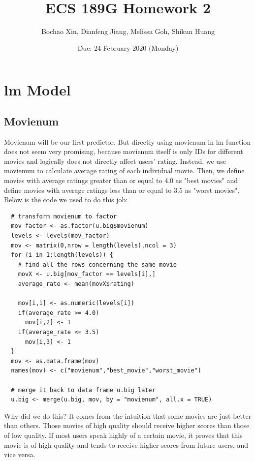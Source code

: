 \documentclass[11pt]{article}
\title{ECS 189G Homework 2}
\author{Bochao Xin, Dianfeng Jiang, Melissa Goh, Shikun Huang}
\date{Due: 24 February 2020 (Monday)}
\begin{document}
\maketitle
\newpage
\tableofcontents
\newpage

\section{lm Model}
\subsection{Movienum}
Movienum will be our first predictor. But directly using movienum 
in lm function does not seem very promising, because movienum 
itself is only IDs for different movies and logically does not 
directly affect users' rating. Instead, we use movienum to 
calculate average rating of each individual movie. Then, we define 
movies with average ratings greater than or equal to 4.0 as 
"best movies" and define movies with average ratings less than or 
equal to 3.5 as "worst movies". Below is the code we used to do 
this job:
\begin{verbatim}
  # transform movienum to factor
  mov_factor <- as.factor(u.big$movienum) 
  levels <- levels(mov_factor)
  mov <- matrix(0,nrow = length(levels),ncol = 3)
  for (i in 1:length(levels)) {
    # find all the rows concerning the same movie
    movX <- u.big[mov_factor == levels[i],]
    average_rate <- mean(movX$rating)
    
    mov[i,1] <- as.numeric(levels[i])
    if(average_rate >= 4.0)
      mov[i,2] <- 1
    if(average_rate <= 3.5)
      mov[i,3] <- 1
  }
  mov <- as.data.frame(mov)
  names(mov) <- c("movienum","best_movie","worst_movie")
  
  # merge it back to data frame u.big later
  u.big <- merge(u.big, mov, by = "movienum", all.x = TRUE)
\end{verbatim}

Why did we do this? It comes from the intuition that some movies 
are just better than others. Those movies of high quality should 
receive higher scores than those of low quality. If most users 
speak highly of a certain movie, it proves that this movie is of 
high quality and tends to receive higher scores from future users, 
and vice versa.
\end{document}
